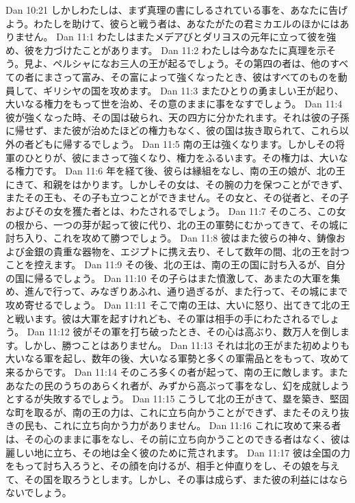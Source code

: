 Dan 10:21  しかしわたしは、まず真理の書にしるされている事を、あなたに告げよう。わたしを助けて、彼らと戦う者は、あなたがたの君ミカエルのほかにはありません。
Dan 11:1  わたしはまたメデアびとダリヨスの元年に立って彼を強め、彼を力づけたことがあります。
Dan 11:2  わたしは今あなたに真理を示そう。見よ、ペルシャになお三人の王が起るでしょう。その第四の者は、他のすべての者にまさって富み、その富によって強くなったとき、彼はすべてのものを動員して、ギリシヤの国を攻めます。
Dan 11:3  またひとりの勇ましい王が起り、大いなる権力をもって世を治め、その意のままに事をなすでしょう。
Dan 11:4  彼が強くなった時、その国は破られ、天の四方に分かたれます。それは彼の子孫に帰せず、また彼が治めたほどの権力もなく、彼の国は抜き取られて、これら以外の者どもに帰するでしょう。
Dan 11:5  南の王は強くなります。しかしその将軍のひとりが、彼にまさって強くなり、権力をふるいます。その権力は、大いなる権力です。
Dan 11:6  年を経て後、彼らは縁組をなし、南の王の娘が、北の王にきて、和親をはかります。しかしその女は、その腕の力を保つことができず、またその王も、その子も立つことができません。その女と、その従者と、その子およびその女を獲た者とは、わたされるでしょう。
Dan 11:7  そのころ、この女の根から、一つの芽が起って彼に代り、北の王の軍勢にむかってきて、その城に討ち入り、これを攻めて勝つでしょう。
Dan 11:8  彼はまた彼らの神々、鋳像および金銀の貴重な器物を、エジプトに携え去り、そして数年の間、北の王を討つことを控えます。
Dan 11:9  その後、北の王は、南の王の国に討ち入るが、自分の国に帰るでしょう。
Dan 11:10  その子らはまた憤激して、あまたの大軍を集め、進んで行って、みなぎりあふれ、通り過ぎるが、また行って、その城にまで攻め寄せるでしょう。
Dan 11:11  そこで南の王は、大いに怒り、出てきて北の王と戦います。彼は大軍を起すけれども、その軍は相手の手にわたされるでしょう。
Dan 11:12  彼がその軍を打ち破ったとき、その心は高ぶり、数万人を倒します。しかし、勝つことはありません。
Dan 11:13  それは北の王がまた初めよりも大いなる軍を起し、数年の後、大いなる軍勢と多くの軍需品とをもって、攻めて来るからです。
Dan 11:14  そのころ多くの者が起って、南の王に敵します。またあなたの民のうちのあらくれ者が、みずから高ぶって事をなし、幻を成就しようとするが失敗するでしょう。
Dan 11:15  こうして北の王がきて、塁を築き、堅固な町を取るが、南の王の力は、これに立ち向かうことができず、またそのえり抜きの民も、これに立ち向かう力がありません。
Dan 11:16  これに攻めて来る者は、その心のままに事をなし、その前に立ち向かうことのできる者はなく、彼は麗しい地に立ち、その地は全く彼のために荒されます。
Dan 11:17  彼は全国の力をもって討ち入ろうと、その顔を向けるが、相手と仲直りをし、その娘を与えて、その国を取ろうとします。しかし、その事は成らず、また彼の利益にはならないでしょう。
